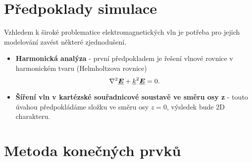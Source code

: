 \section{Předpoklady simulace}
Vzhledem k široké problematice elektromagnetických vln je potřeba pro jejich modelování zavést některé zjednodušení. 
\begin{itemize}
\item {\bf Harmonická analýza} - první předpokladem je řešení vlnové rovnice v harmonickém tvaru (Helmholtzova rovnice)
\begin{displaymath}
	\nabla^{2}\mbox{\underline{\boldmath$E$}} +{\underline{k}}^{2}\mbox{\underline{\boldmath$E$}} = 0.
\end{displaymath}
\item {\bf Šíření vln v kartézské souřadnicové soustavě ve směru osy z} - touto úvahou předpokládáme složku ve směru osy $z = 0$, výsledek bude 2D charakteru.
\end{itemize}
\newpage

\section{Metoda konečných prvků}

